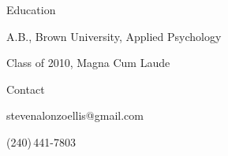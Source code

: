 \documentclass[12pt]{res}
\begin{document}
{\begin{resume}
\begin{minipage}{7.6in}
\begin{list}{}{\leftmargin=0em}
\item{Education\dotfill 
\begin{list}{-}{\leftmargin=1em}
\item A.B., Brown University, Applied Psychology
\item Class of 2010, Magna Cum Laude
\end{list}}

\item{Contact\dotfill 
\begin{list}{-}{\leftmargin=1em}
\item stevenalonzoellis@gmail.com
\item (240)\,441-7803
\end{list}}
\end{list}
\vspace{27mm}
\centering\fontsize{17pt}{30pt}\zapfinofont
{}
\vspace{17mm}
\end{minipage}
\end{resume}
} %
\end{document}

